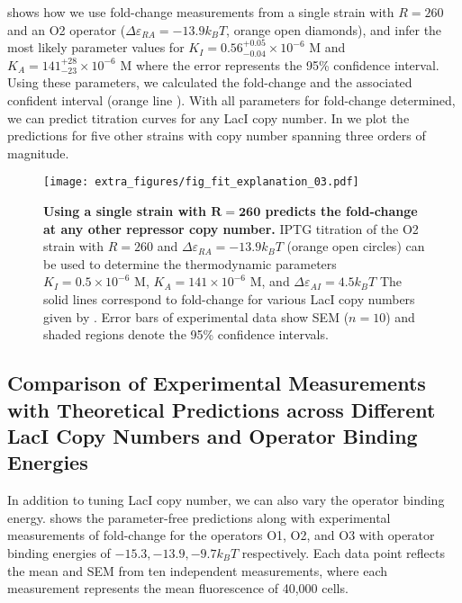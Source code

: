  shows how we use fold-change measurements from a single
strain with $R=260$ and an O2 operator ($\Delta\varepsilon_{RA}=-13.9k_BT$, orange open diamonds), and infer the
most likely parameter values for $K_I=0.56^{+0.05}_{-0.04} \times 10^{-6}\,\, \text{M}$ and $K_A=141^{+28}_{-23} \times
10^{-6} \,\, \text{M}$ where the error represents the 95\% confidence interval. Using these parameters, we calculated the
fold-change \eref[eq7] and the associated confident interval (orange line ). With all parameters for fold-change determined, we can predict titration curves for any LacI copy number. In  we plot the predictions for five other strains with copy number spanning three orders of magnitude.

\begin{figure}[h]
	\centering \texttt{[image: extra\_figures/fig\_fit\_explanation\_03.pdf]}
	\caption{{\bf Using a single strain with $\boldsymbol{R=260}$ predicts the fold-change at any other repressor copy number.} IPTG titration of the O2 strain with $R=260$ and $\Delta\varepsilon_{RA} = -13.9k_BT$ (orange open circles) can be used to determine the thermodynamic parameters $K_I=0.5 \times 10^{-6} \,\, \text{M}$, $K_A=141 \times 10^{-6} \,\, \text{M}$, and $\Delta \varepsilon_{AI}=4.5k_BT$ The solid lines correspond to fold-change for various LacI copy numbers given by \eref[eq7]. Error bars of experimental data show SEM ($n=10$) and shaded regions denote the 95\% confidence intervals.} \label{fig_result1}
\end{figure}

\subsection*{Comparison of Experimental Measurements with Theoretical Predictions across Different LacI Copy Numbers and Operator Binding Energies}

In addition to tuning LacI copy number, we can also vary the operator binding energy.
 shows the parameter-free predictions along with experimental
measurements of fold-change for the operators O1, O2, and O3 with operator binding energies of $-15.3, -13.9, -9.7k_BT$ respectively. Each data point reflects the
mean and SEM from ten independent measurements, where each measurement
represents the mean fluorescence of 40,000 cells.

